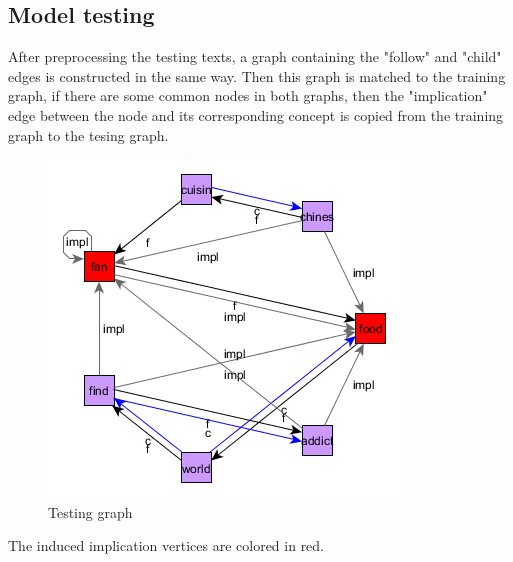 \subsection{Model testing}
After preprocessing the testing texts, a graph containing the "follow" and "child" edges is constructed in the same way. Then this graph is matched to the training graph, if there are some common nodes in both graphs, then the "implication" edge between the node and its corresponding concept is copied from the training graph to the tesing graph.
\begin{figure}[!hb]
	  \centering
	  \includegraphics[scale=0.6]{graphics/onlytestsentence.png} 
	  \caption{Testing graph}
	  \label{fig:trainingGraph}
\end{figure}
The induced implication vertices are colored in red.





%










